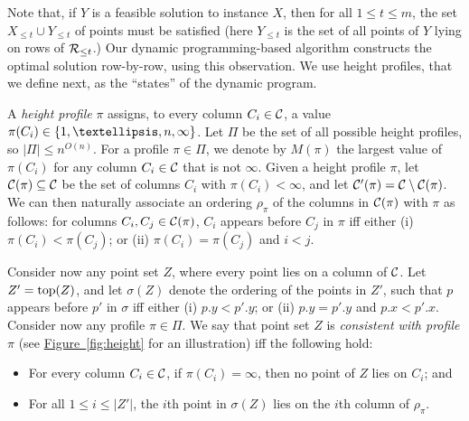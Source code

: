\documentclass[11pt]{article}
\numberwithin{equation}{section}
\theoremstyle{definition}
\theoremstyle{plain}
\newcommand{\expref}[2]{\hyperref[#2]{#1~\ref{#2}}}
\begin{document}
Note that, if $Y$ is a feasible solution to instance $X$, then for all $1\leq t\leq m$, the set $X_{\leq t}\cup Y_{\leq t}$ of points must be satisfied (here $Y_{\leq t}$ is the set of all points of $Y$ lying on rows of ${\mathcal R}_{\leq t}$.) Our dynamic programming-based algorithm constructs the optimal solution row-by-row, using this observation. We use height profiles, that we define next, as the ``states'' of the dynamic program.

 
%


A \emph{height profile} $\pi$ assigns, to every column $C_i\in {\mathcal C}$, a value $\pi(C_i)\in \set{1,\ldots,n,\infty}$. Let $\Pi$ be the set of all possible height profiles, so $|\Pi|\leq n^{O(n)}$. For a profile $\pi\in \Pi$, we denote by $M(\pi)$ the largest value of $\pi(C_i)$ for any column $C_i\in {\mathcal C}$ that is not $\infty$. Given a height profile $\pi$, let ${\mathcal C}(\pi)\subseteq {\mathcal C}$ be the set of columns $C_i$ with $\pi(C_i)<\infty$, and let ${\mathcal C}'(\pi)={\mathcal C}\setminus{\mathcal C}(\pi)$. We can then naturally associate an ordering $\rho_{\pi}$ of the columns in ${\mathcal C}(\pi)$ with $\pi$ as follows: for columns $C_i,C_j\in {\mathcal C}(\pi)$, $C_i$ appears before $C_j$ in $\pi$ iff either  (i) $\pi(C_i)<\pi(C_{j})$; or (ii) $\pi(C_i)=\pi(C_{j})$ and $i<j$.

Consider now any point set $Z$, where every point lies on a column of ${\mathcal C}$. Let $Z'=\operatorname{top}(Z)$, and let $\sigma(Z)$ denote the ordering of the points in $Z'$, such that $p$ appears before $p'$ in $\sigma$ iff either (i) $p.y<p'.y$; or (ii) $p.y=p'.y$ and $p.x<p'.x$. 
Consider now any profile  $\pi\in \Pi$.
We say that point set $Z$ is \emph{consistent with profile $\pi$} (see \expref{Figure}{fig:height} for an illustration) iff the following hold:

\begin{itemize}
	\item For every column $C_i\in {\mathcal C}$, if $\pi(C_i)=\infty$, then no point of $Z$ lies on $C_i$; and
	\item For all $1\leq i\leq |Z'|$, the $i$th point in $\sigma(Z)$ lies on the $i$th column of $\rho_{\pi}$.
\end{itemize}
\end{document}
